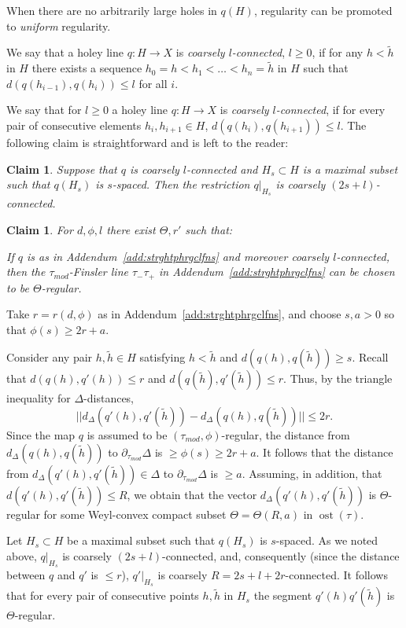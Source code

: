 \documentclass[12pt]{article}
\theoremstyle{boldplain}
\newtheorem{claim}[equation]{Claim}
\theoremstyle{bolddefinition}
\numberwithin{equation}{section}
\def\De{\Delta}
\def\Dt{\partial_{\tau_{mod}}}
\def\ost{\operatorname{ost}}
\def\taumod{\tau_{mod}}
\def\mini{\scriptsize}
\begin{document}
\medskip
When there are no arbitrarily large holes {in $q(H)$}, regularity can be promoted to {\em uniform} regularity.

{\mini We say that a holey line $q: H\to X$ is {\em coarsely $l$-connected}, $l\geq0$,
if for any $h<\tilde h$ in $H$ there exists a sequence $h_0=h<h_1<\ldots<h_n=\tilde h$ in $H$ 
such that $d(q(h_{i-1}),q(h_i))\leq l$ for all $i$.}

{We say that for $l\geq0$ a holey line $q: H\to X$ is {\em coarsely $l$-connected}, 
if for every pair of consecutive elements $h_i, h_{i+1}\in H$, 
$d(q(h_{i}),q(h_{i+1}))\leq l$. The following claim is straightforward and is left to the reader:}

\begin{claim}
{Suppose that $q$ is coarsely $l$-connected and $H_s\subset H$ is a maximal subset such that $q(H_s)$ is $s$-spaced. 
Then the restriction $q|_{H_s}$ is coarsely $(2s+l)$-connected.
}
\end{claim}


\begin{claim}
\label{claim:lngsgmnfrg}
For $d,\phi,l$ there exist $\Theta, r'$ such that:

If $q$ is as in Addendum~\ref{add:strghtphrgclfns}
and moreover coarsely $l$-connected,
then the $\taumod$-Finsler line $\tau_-\tau_+$ {in Addendum~\ref{add:strghtphrgclfns}} can be chosen to be $\Theta$-regular.
\end{claim}
Take $r=r(d,\phi)$ as in Addendum~\ref{add:strghtphrgclfns},
and choose $s,a>0$ so that $\phi(s) \geq 2r+a$. 


{Consider any pair $h, \tilde h\in H$ satisfying $h<\tilde h$ and $d(q(h),q(\tilde h))\geq s$. Recall that $d(q(h), q'(h))\le r$ and  $d(q(\tilde h), q'(\tilde h))\le r$. Thus, by the triangle inequality for $\Delta$-distances,
$$
||d_{\De}(q'(h),q'(\tilde h))- d_{\De}(q(h),q(\tilde h))||\le 2r. 
$$
Since the map $q$ is assumed to be $(\taumod,\phi)$-regular, the distance from $d_{\De}(q(h),q(\tilde h))$ to $\Dt\De$ is $\ge \phi(s)\ge 2r+a$. 
It follows that the distance from 
$d_{\De}(q'(h),q'(\tilde h))\in \De$ to $\Dt\De$ is $\geq a$. Assuming, in addition, that $d(q'(h), q'(\tilde h))\le R$, we obtain that the vector $d_{\De}(q'(h),q'(\tilde h))$ is $\Theta$-regular for some 
Weyl-convex compact subset $\Theta=\Theta(R,a)$ in $\ost(\tau)$}.

Let $H_s\subset H$ {be a maximal subset such} that $q(H_s)$ is $s$-spaced. 
{As we noted above}, $q|_{H_s}$ is coarsely $(2s+l)$-connected,
and, consequently (since the distance between $q$ and $q'$ is $\le r$), $q'|_{H_s}$ is coarsely $R=2s+l+2r$-connected.  
It follows that for every pair of consecutive points $h, \tilde h$ in $H_s$ the segment $q'(h) q'(\tilde h)$ is $\Theta$-regular. 
\end{document}
